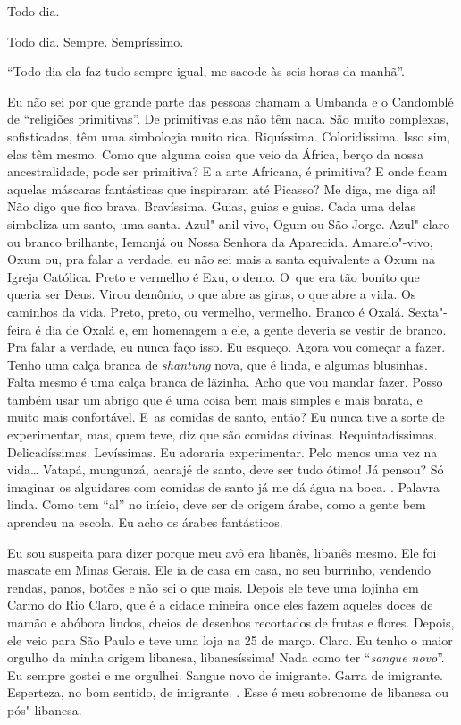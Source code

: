 Todo dia.

Todo dia. Sempre. Sempríssimo.

``Todo dia ela faz tudo sempre igual, me sacode às seis horas da
manhã''.

Eu não sei por que grande parte das pessoas chamam a Umbanda e o
Candomblé de ``religiões primitivas''. De primitivas elas não têm nada.
São muito complexas, sofisticadas, têm uma simbologia muito rica.
Riquíssima. Coloridíssima. Isso sim, elas têm mesmo. Como que alguma
coisa que veio da África, berço da nossa ancestralidade, pode ser
primitiva? E a arte Africana, é primitiva? E onde ficam aquelas
máscaras fantásticas que inspiraram até Picasso? Me diga, me diga aí!
Não digo que fico brava. Bravíssima. Guias, guias e guias. Cada uma
delas simboliza um santo, uma santa. Azul"-anil vivo, Ogum ou São Jorge.
Azul"-claro ou branco brilhante, Iemanjá ou Nossa Senhora da Aparecida.
Amarelo"-vivo, Oxum ou, pra falar a verdade, eu não sei mais a
santa equivalente a Oxum na Igreja Católica. Preto e vermelho é Exu, o
demo. O~que era tão bonito que queria ser Deus. Virou demônio, o que
abre as giras, o que abre a vida. Os caminhos da vida. Preto, preto, ou
vermelho, vermelho. Branco é Oxalá. Sexta"-feira é dia de Oxalá e, em
homenagem a ele, a gente deveria se vestir de branco. Pra falar a
verdade, eu nunca faço isso. Eu esqueço. Agora vou começar a fazer.
Tenho uma calça branca de \emph{shantung} nova, que é linda, e algumas
blusinhas. Falta mesmo é uma calça branca de lãzinha. Acho que vou
mandar fazer. Posso também usar um abrigo que é uma coisa bem mais
simples e mais barata, e muito mais confortável. E~as comidas de santo,
então? Eu nunca tive a sorte de experimentar, mas, quem teve, diz que
são comidas divinas. Requintadíssimas. Delicadíssimas. Levíssimas. Eu
adoraria experimentar. Pelo menos uma vez na vida… Vatapá,
mungunzá, acarajé de santo, deve ser tudo ótimo! Já pensou? Só imaginar
os alguidares com comidas de santo já me dá água na boca. .
Palavra linda. Como tem ``al'' no início, deve ser de origem árabe, como
a gente bem aprendeu na escola. Eu acho os árabes fantásticos.

Eu sou suspeita para dizer porque meu avô era libanês, libanês mesmo.
Ele foi mascate em Minas Gerais. Ele ia de casa em casa, no seu
burrinho, vendendo rendas, panos, botões e não sei o que mais. Depois
ele teve uma lojinha em Carmo do Rio Claro, que é a cidade mineira onde
eles fazem aqueles doces de mamão e abóbora lindos, cheios de desenhos
recortados de frutas e flores. Depois, ele veio para São Paulo e teve
uma loja na 25 de março. Claro. Eu tenho o maior orgulho da minha origem
libanesa, libanesíssima! Nada como ter ``\emph{sangue novo}''. Eu sempre
gostei e me orgulhei. Sangue novo de imigrante. Garra de imigrante.
Esperteza, no bom sentido, de imigrante. . Esse é meu sobrenome de
libanesa ou pós"-libanesa.

